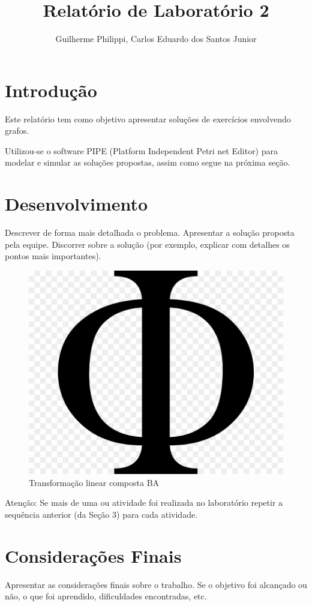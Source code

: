 \documentclass[a4paper,12pt]{article}
\title{Relatório de Laboratório 2}
\author{Guilherme Philippi, Carlos Eduardo dos Santos Junior}
\begin{document}
\maketitle
\tableofcontents

\section{Introdução}

Este relatório tem como objetivo apresentar soluções de exercícios envolvendo grafos.

Utilizou-se o software PIPE (Platform Independent Petri net Editor) \cite{dias2007ferramentas} para modelar e simular as soluções propostas, assim como segue na próxima seção.

\section{Desenvolvimento}
Descrever de forma mais detalhada o problema.
Apresentar a solução proposta pela equipe.
Discorrer sobre a solução (por exemplo, explicar com detalhes os pontos mais
importantes).

\begin{figure}[H]
	\begin{center}
		\includegraphics[width=0.4\linewidth]{img.png}
	\end{center}
	\caption{Transformação linear composta BA}
	\label{fig:compfunc}
\end{figure}

Atenção: Se mais de uma ou atividade foi realizada no laboratório repetir a sequência
anterior (da Seção 3) para cada atividade.

\section{Considerações Finais}
Apresentar as considerações finais sobre o trabalho. Se o objetivo foi alcançado ou não,
o que foi aprendido, dificuldades encontradas, etc.

{}



\end{document}
